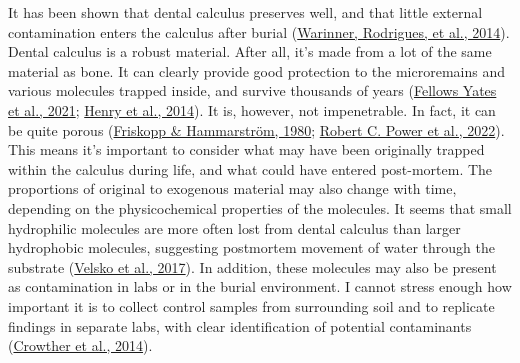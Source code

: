 \documentclass[
  b5paper,
]{book}
\begin{document}
It has been shown that dental calculus preserves well, and that little
external contamination enters the calculus after burial
(\protect\hyperlink{ref-warinnerPathogensHost2014}{Warinner, Rodrigues,
et al., 2014}). Dental calculus is a robust material. After all, it's
made from a lot of the same material as bone. It can clearly provide
good protection to the microremains and various molecules trapped
inside, and survive thousands of years
(\protect\hyperlink{ref-yatesOralMicrobiome2021}{Fellows Yates et al.,
2021}; \protect\hyperlink{ref-henryNeanderthalCalculus2014}{Henry et
al., 2014}). It is, however, not impenetrable. In fact, it can be quite
porous (\protect\hyperlink{ref-friskoppComparativeScanning1980}{Friskopp
\& Hammarström, 1980};
\protect\hyperlink{ref-powerSynchrotronRadiationbased2022}{Robert C.
Power et al., 2022}). This means it's important to consider what may
have been originally trapped within the calculus during life, and what
could have entered post-mortem. The proportions of original to exogenous
material may also change with time, depending on the physicochemical
properties of the molecules. It seems that small hydrophilic molecules
are more often lost from dental calculus than larger hydrophobic
molecules, suggesting postmortem movement of water through the substrate
(\protect\hyperlink{ref-velskoDentalCalculus2017}{Velsko et al., 2017}).
In addition, these molecules may also be present as contamination in
labs or in the burial environment. I cannot stress enough how important
it is to collect control samples from surrounding soil and to replicate
findings in separate labs, with clear identification of potential
contaminants
(\protect\hyperlink{ref-crowtherDocumentingContamination2014}{Crowther
et al., 2014}).
\end{document}
